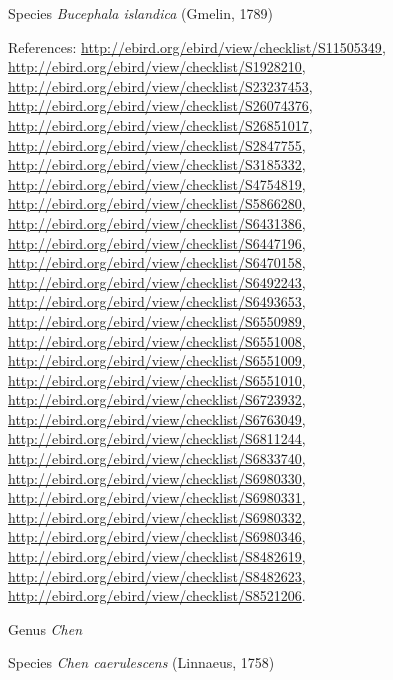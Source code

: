 \documentclass[9pt, article]{memoir}
\begin{document}
\begin{multicols}{2}
\vspace{6pt}\noindent\hspace{36pt}Species \textit{Bucephala islandica} (Gmelin, 1789)


\vspace{6pt}References: 
\url{http://ebird.org/ebird/view/checklist/S11505349}, 
\url{http://ebird.org/ebird/view/checklist/S1928210}, 
\url{http://ebird.org/ebird/view/checklist/S23237453}, 
\url{http://ebird.org/ebird/view/checklist/S26074376}, 
\url{http://ebird.org/ebird/view/checklist/S26851017}, 
\url{http://ebird.org/ebird/view/checklist/S2847755}, 
\url{http://ebird.org/ebird/view/checklist/S3185332}, 
\url{http://ebird.org/ebird/view/checklist/S4754819}, 
\url{http://ebird.org/ebird/view/checklist/S5866280}, 
\url{http://ebird.org/ebird/view/checklist/S6431386}, 
\url{http://ebird.org/ebird/view/checklist/S6447196}, 
\url{http://ebird.org/ebird/view/checklist/S6470158}, 
\url{http://ebird.org/ebird/view/checklist/S6492243}, 
\url{http://ebird.org/ebird/view/checklist/S6493653}, 
\url{http://ebird.org/ebird/view/checklist/S6550989}, 
\url{http://ebird.org/ebird/view/checklist/S6551008}, 
\url{http://ebird.org/ebird/view/checklist/S6551009}, 
\url{http://ebird.org/ebird/view/checklist/S6551010}, 
\url{http://ebird.org/ebird/view/checklist/S6723932}, 
\url{http://ebird.org/ebird/view/checklist/S6763049}, 
\url{http://ebird.org/ebird/view/checklist/S6811244}, 
\url{http://ebird.org/ebird/view/checklist/S6833740}, 
\url{http://ebird.org/ebird/view/checklist/S6980330}, 
\url{http://ebird.org/ebird/view/checklist/S6980331}, 
\url{http://ebird.org/ebird/view/checklist/S6980332}, 
\url{http://ebird.org/ebird/view/checklist/S6980346}, 
\url{http://ebird.org/ebird/view/checklist/S8482619}, 
\url{http://ebird.org/ebird/view/checklist/S8482623}, 
\url{http://ebird.org/ebird/view/checklist/S8521206}.

\vspace{6pt}\noindent\hspace{30pt}Genus \textit{Chen}


\vspace{6pt}\noindent\hspace{36pt}Species \textit{Chen caerulescens} (Linnaeus, 1758)



\end{multicols}
\end{document}
